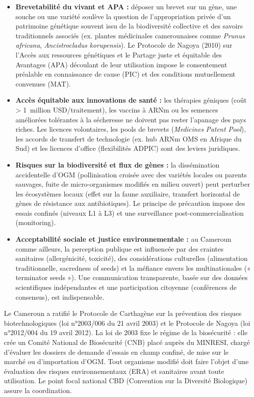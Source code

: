 \documentclass[11pt]{article}
\newcommand{\cle}[1]{{\popxbold\color{popdark}#1}}
\begin{document}
\begin{itemize}
    \item \textbf{Brevetabilité du vivant et APA :} déposer un brevet sur un gène, une souche ou une variété soulève la question de l'appropriation privée d'un patrimoine génétique souvent issu de la biodiversité collective et des savoirs traditionnels associés (ex. plantes médicinales camerounaises comme \emph{Prunus africana}, \emph{Ancistrocladus korupensis}). Le \cle{Protocole de Nagoya} (2010) sur l'Accès aux ressources génétiques et le Partage juste et équitable des Avantages (APA) découlant de leur utilisation impose le consentement préalable en connaissance de cause (PIC) et des conditions mutuellement convenues (MAT).
    \item \textbf{Accès équitable aux innovations de santé :} les thérapies géniques (coût > \SI{1}{million} USD/traitement), les vaccins à ARNm ou les semences améliorées tolérantes à la sécheresse ne doivent pas rester l'apanage des pays riches. Les licences volontaires, les pools de brevets (\emph{Medicines Patent Pool}), les accords de transfert de technologie (ex. hub ARNm OMS en Afrique du Sud) et les licences d'office (flexibilités ADPIC) sont des leviers juridiques.
    \item \textbf{Risques sur la biodiversité et flux de gènes :} la dissémination accidentelle d'OGM (pollinisation croisée avec des variétés locales ou parents sauvages, fuite de micro-organismes modifiés en milieu ouvert) peut perturber les écosystèmes locaux (effet sur la faune auxiliaire, transfert horizontal de gènes de résistance aux antibiotiques). Le principe de précaution impose des essais confinés (niveaux L1 à L3) et une surveillance post-commercialisation (monitoring).
    \item \textbf{Acceptabilité sociale et justice environnementale :} au Cameroun comme ailleurs, la perception publique est influencée par des craintes sanitaires (allergénicité, toxicité), des considérations culturelles (alimentation traditionnelle, sacredness of seeds) et la méfiance envers les multinationales (« terminator seeds »). Une communication transparente, basée sur des données scientifiques indépendantes et une participation citoyenne (conférences de consensus), est indispensable.
\end{itemize}

\begin{savaistu}
Le Cameroun a ratifié le \cle{Protocole de Carthagène} sur la prévention des risques biotechnologiques (loi n°2003/006 du 21 avril 2003) et le \cle{Protocole de Nagoya} (loi n°2012/004 du 19 avril 2012). La loi de 2003 fixe le régime de la biosécurité : elle crée un \cle{Comité National de Biosécurité (CNB)} placé auprès du MINRESI, chargé d'évaluer les dossiers de demande d'essais en champ confiné, de mise sur le marché ou d'importation d'OGM. Tout organisme modifié doit faire l'objet d'une évaluation des risques environnementaux (ERA) et sanitaires avant toute utilisation. Le point focal national CBD (Convention sur la Diversité Biologique) assure la coordination.
\end{savaistu}
\end{document}
